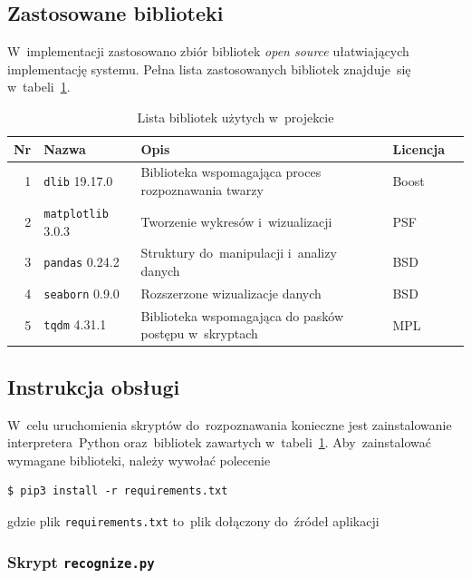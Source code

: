 \documentclass[11pt,a4paper]{article}
\begin{document}
\subsection{Zastosowane biblioteki}

W~implementacji zastosowano zbiór bibliotek \emph{open source} ułatwiających implementację systemu.
Pełna lista zastosowanych bibliotek znajduje~się w~tabeli~\ref{tbl:libraries}.

\begin{table}[H]
    \begin{tabularx}{\textwidth}{|r|l|X|l|c|}
        \hline
        Nr & Nazwa & Opis & Licencja & \\
        \hline
        \hline
        1 & \texttt{dlib} 19.17.0 & Biblioteka wspomagająca proces rozpoznawania twarzy & Boost & \cite{king2003} \\
        \hline
        2 & \texttt{matplotlib} 3.0.3 & Tworzenie wykresów i~wizualizacji & PSF & \cite{hunter2007} \\
        \hline
        3 & \texttt{pandas} 0.24.2 & Struktury do~manipulacji i~analizy danych & BSD & \cite{mckinney2010} \\
        \hline
        4 & \texttt{seaborn} 0.9.0 & Rozszerzone wizualizacje danych & BSD & \cite{waskom2018} \\
        \hline
        5 & \texttt{tqdm} 4.31.1 & Biblioteka wspomagająca do pasków postępu w~skryptach & MPL & \cite{dacosta2016} \\
        \hline
    \end{tabularx}
    \caption{Lista bibliotek użytych w~projekcie}
    \label{tbl:libraries}
\end{table}

\subsection{Instrukcja obsługi}
\label{sec:manual}

W~celu uruchomienia skryptów do~rozpoznawania konieczne jest zainstalowanie interpretera~Python oraz~bibliotek zawartych w~tabeli~\ref{tbl:libraries}.
Aby~zainstalować wymagane biblioteki, należy wywołać polecenie
\begin{verbatim}
$ pip3 install -r requirements.txt
\end{verbatim}
gdzie plik \texttt{requirements.txt} to~plik dołączony do~źródeł aplikacji

\subsubsection{Skrypt \texttt{recognize.py}}
\end{document}
